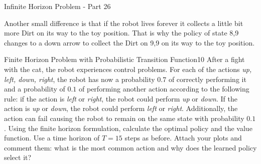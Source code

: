 \begin{questions}
\begin{question}{Infinite Horizon Problem - Part 2}{6}
\begin{answer}
Another small difference is that if the robot lives forever it collects a little bit more Dirt on its way to the toy position. That is why the policy of state 8,9 changes to a down arrow to collect the Dirt on 9,9 on its way to the toy position. 


\end{answer}


\end{question}



\begin{question}{Finite Horizon Problem with Probabilistic Transition Function}{10}
After a fight with the cat, the robot experiences control problems. 
For each of the actions \textit{up, left, down, right}, the robot has now a probability $0.7$ of correctly performing it and a probability of $0.1$ of performing another action according to the following rule: if the action is \textit{left} or \textit{right}, the robot could perform \textit{up} or \textit{down}. If the action is \textit{up} or \textit{down}, the robot could perform \textit{left} or \textit{right}.
Additionally, the action can fail causing the robot to remain on the same state with probability $0.1$.
Using the finite horizon formulation, calculate the optimal policy and the value function. Use a time horizon of $T=15$ steps as before. Attach your plots and comment them: what is the most common action and why does the learned policy select it?


\end{question}
\end{questions}
